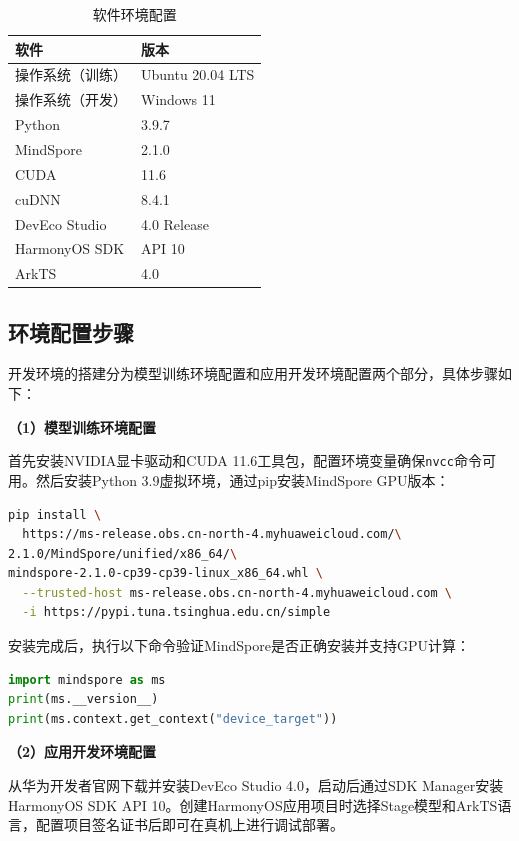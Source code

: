 \begin{table}[htbp]
	\centering
	\caption{软件环境配置}
	\label{tab:software}
	\begin{tabular}{ll}
		\toprule
		软件 & 版本 \\
		\midrule
		操作系统（训练） & Ubuntu 20.04 LTS \\
		操作系统（开发） & Windows 11 \\
		Python & 3.9.7 \\
		MindSpore & 2.1.0 \\
		CUDA & 11.6 \\
		cuDNN & 8.4.1 \\
		DevEco Studio & 4.0 Release \\
		HarmonyOS SDK & API 10 \\
		ArkTS & 4.0 \\
		\bottomrule
	\end{tabular}
\end{table}

\subsection{环境配置步骤}

开发环境的搭建分为模型训练环境配置和应用开发环境配置两个部分，具体步骤如下：

\textbf{（1）模型训练环境配置}

首先安装NVIDIA显卡驱动和CUDA 11.6工具包，配置环境变量确保\texttt{nvcc}命令可用。然后安装Python 3.9虚拟环境，通过pip安装MindSpore GPU版本：

\begin{lstlisting}[language=bash, caption={MindSpore安装命令}]
pip install \
  https://ms-release.obs.cn-north-4.myhuaweicloud.com/\
2.1.0/MindSpore/unified/x86_64/\
mindspore-2.1.0-cp39-cp39-linux_x86_64.whl \
  --trusted-host ms-release.obs.cn-north-4.myhuaweicloud.com \
  -i https://pypi.tuna.tsinghua.edu.cn/simple
\end{lstlisting}

安装完成后，执行以下命令验证MindSpore是否正确安装并支持GPU计算：

\begin{lstlisting}[language=Python, caption={MindSpore安装验证}]
import mindspore as ms
print(ms.__version__)
print(ms.context.get_context("device_target"))
\end{lstlisting}

\textbf{（2）应用开发环境配置}

从华为开发者官网下载并安装DevEco Studio 4.0，启动后通过SDK Manager安装HarmonyOS SDK API 10。创建HarmonyOS应用项目时选择Stage模型和ArkTS语言，配置项目签名证书后即可在真机上进行调试部署。

